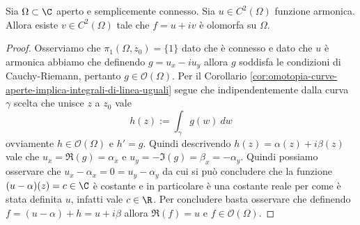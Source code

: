 \begin{theorem}
  Sia $\Omega \subset \C$ aperto e semplicemente connesso. Sia $u \in
  C^2(\Omega)$ funzione armonica. Allora esiste $v \in C^2(\Omega)$ tale che
  $f = u + iv$ è olomorfa su $\Omega$.
  \label{thr:esistenza-armonica-congiunta}
\end{theorem}
\begin{proof}
    Osserviamo che $\pi_1(\Omega, z_0) = \{1\}$ dato che è connesso e dato che
    $u$ è armonica abbiamo che definendo $g = u_x - iu_y$ allora $g$ soddisfa le
    condizioni di Cauchy-Riemann, pertanto $g \in \mathcal{O}(\Omega)$. Per il
    Corollario \ref{cor:omotopia-curve-aperte-implica-integrali-di-linea-uguali}
    segue che indipendentemente dalla curva $\gamma$ scelta che unisce $z$
    a $z_0$ vale
    \begin{equation*}
        h(z) := \int_\gamma g(w)\ dw
    \end{equation*}
    ovviamente $h \in \mathcal{O}(\Omega)$ e $h' = g$.
    Quindi descrivendo $h(z) = \alpha(z) + i\beta(z)$ vale che $u_x = \Re(g)
    = \alpha_x$ e $u_y = -\Im(g) = \beta_x = -\alpha_y$. Quindi possiamo
    osservare che $u_x - \alpha_x = 0 = u_y - \alpha_y$ da cui si può
    concludere che la funzione $(u-\alpha)(z) = c \in \C$ è costante e in 
    particolare è una costante reale per come è stata definita $u$, infatti 
    vale $c \in \R$. Per concludere basta osservare che definendo 
    $f = (u - \alpha) + h = u + i\beta$ allora $\Re(f) = u$ e $f \in
    \mathcal{O}(\Omega)$.
\end{proof}


